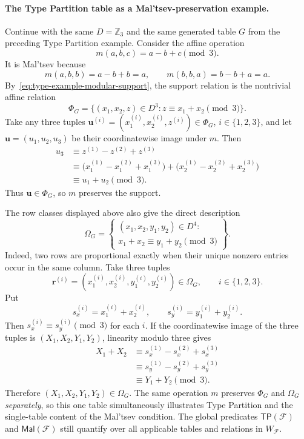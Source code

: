 \documentclass[11pt]{article}
\theoremstyle{plain}
\theoremstyle{definition}
\theoremstyle{remark}
\newcommand{\cF}{\mathcal F}
\newcommand{\TP}{\mathsf{TP}}
\newcommand{\Mal}{\mathsf{Mal}}
\newcommand{\SuppRel}[1]{\Phi_{#1}}
\newcommand{\RowEq}[1]{\Omega_{#1}}
\begin{document}
\paragraph{The Type Partition table as a Mal'tsev-preservation example.}
Continue with the same $D=\mathbb Z_3$ and the same generated table $G$
from the preceding Type Partition example.  Consider the affine operation
\[
  m(a,b,c)=a-b+c\pmod3.
\]
It is Mal'tsev because
\[
  m(a,b,b)=a-b+b=a,
  \qquad
  m(b,b,a)=b-b+a=a.
\]
By~\eqref{eq:type-example-modular-support}, the support relation is the
nontrivial affine relation
\[
  \SuppRel G
  =\{(x_1,x_2,z)\in D^3:z\equiv x_1+x_2\pmod3\}.
\]
Take any three tuples
$\mathbf u^{(i)}=(x_1^{(i)},x_2^{(i)},z^{(i)})\in\SuppRel G$,
$i\in\{1,2,3\}$, and let
$\mathbf u=(u_1,u_2,u_3)$ be their coordinatewise image under $m$.  Then
\[
\begin{aligned}
  u_3
  &\equiv z^{(1)}-z^{(2)}+z^{(3)}\\
  &\equiv
    \bigl(x_1^{(1)}-x_1^{(2)}+x_1^{(3)}\bigr)
    +\bigl(x_2^{(1)}-x_2^{(2)}+x_2^{(3)}\bigr)\\
  &\equiv u_1+u_2\pmod3.
\end{aligned}
\]
Thus $\mathbf u\in\SuppRel G$, so $m$ preserves the support.

The row classes displayed above also give the direct description
\[
  \RowEq G
  =
  \left\{
  \begin{array}{l}
    (x_1,x_2,y_1,y_2)\in D^4:\\
    x_1+x_2\equiv y_1+y_2\pmod3
  \end{array}
  \right\}.
\]
Indeed, two rows are proportional exactly when their unique nonzero entries
occur in the same column.  Take three tuples
\[
  \mathbf r^{(i)}
  =(x_1^{(i)},x_2^{(i)},y_1^{(i)},y_2^{(i)})\in\RowEq G,
  \qquad i\in\{1,2,3\}.
\]
Put
\[
  s_x^{(i)}=x_1^{(i)}+x_2^{(i)},
  \qquad
  s_y^{(i)}=y_1^{(i)}+y_2^{(i)}.
\]
Then $s_x^{(i)}\equiv s_y^{(i)}\pmod3$ for each $i$.  If the coordinatewise
image of the three tuples is $(X_1,X_2,Y_1,Y_2)$, linearity modulo three
gives
\[
\begin{aligned}
  X_1+X_2
  &\equiv s_x^{(1)}-s_x^{(2)}+s_x^{(3)}\\
  &\equiv s_y^{(1)}-s_y^{(2)}+s_y^{(3)}\\
  &\equiv Y_1+Y_2\pmod3.
\end{aligned}
\]
Therefore $(X_1,X_2,Y_1,Y_2)\in\RowEq G$.  The same operation $m$
preserves $\SuppRel G$ and $\RowEq G$ \emph{separately}, so this one table
simultaneously illustrates Type Partition and the single-table content of
the Mal'tsev condition.  The global predicates $\TP(\cF)$ and $\Mal(\cF)$
still quantify over all applicable tables and relations in $W_{\cF}$.
\end{document}
